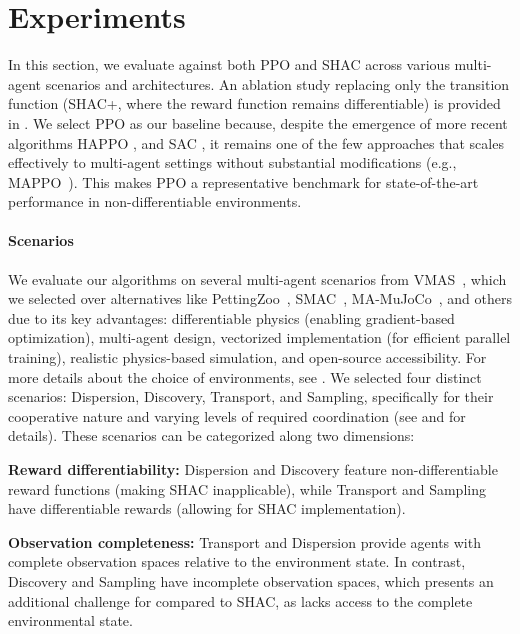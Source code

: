 \section{Experiments}\label{sect:experiments}

In this section, we evaluate \fname{} against both PPO and SHAC across various multi-agent scenarios and architectures. An ablation study replacing only the transition function (SHAC+, where the reward function remains differentiable) is provided in .
We select PPO as our baseline because, despite the emergence of more recent algorithms HAPPO \cite{Kuba2021TrustRM}, and SAC \cite{Haarnoja2018SoftAA}, it remains one of the few approaches that scales effectively to multi-agent settings without substantial modifications (e.g., MAPPO~\cite{DBLP:conf/nips/YuVVGWBW22}). This makes PPO a representative benchmark for state-of-the-art performance in non-differentiable environments.

\paragraph{Scenarios}
We evaluate our algorithms on several multi-agent scenarios from VMAS~\cite{DBLP:conf/dars/BettiniKBP22}, which we selected over alternatives like PettingZoo~\cite{DBLP:conf/icml/PettingZoo}, SMAC~\cite{DBLP:conf/icml/ZhangZLZ20}, MA-MuJoCo~\cite{DBLP:conf/aaai/GuptaK0G20}, and others due to its key advantages: differentiable physics (enabling gradient-based optimization), multi-agent design, vectorized implementation (for efficient parallel training), realistic physics-based simulation, and open-source accessibility.
For more details about the choice of environments, see .
We selected four distinct scenarios: Dispersion, Discovery, Transport, and Sampling, specifically for their cooperative nature and varying levels of required coordination (see  and  for details). These scenarios can be categorized along two dimensions:
\begin{compactitem}
    \item \textbf{Reward differentiability:} Dispersion and Discovery feature non-differentiable reward functions (making SHAC inapplicable), while Transport and Sampling have differentiable rewards (allowing for SHAC implementation).
    \item \textbf{Observation completeness:} Transport and Dispersion provide agents with complete observation spaces relative to the environment state. In contrast, Discovery and Sampling have incomplete observation spaces, which presents an additional challenge for \fname{} compared to SHAC, as \fname{} lacks access to the complete environmental state.
\end{compactitem}

